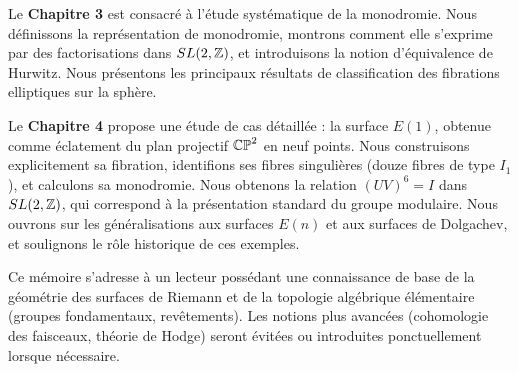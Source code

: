 Le \textbf{Chapitre 3} est consacré à l'étude systématique de la monodromie. Nous définissons la représentation de monodromie, montrons comment elle s'exprime par des factorisations dans $SL(2,\mathbb{Z})$, et introduisons la notion d'équivalence de Hurwitz. Nous présentons les principaux résultats de classification des fibrations elliptiques sur la sphère.

Le \textbf{Chapitre 4} propose une étude de cas détaillée : la surface $E(1)$, obtenue comme éclatement du plan projectif $\mathbb{CP}^2$ en neuf points. Nous construisons explicitement sa fibration, identifions ses fibres singulières (douze fibres de type $I_1$), et calculons sa monodromie. Nous obtenons la relation $(UV)^6 = I$ dans $SL(2,\mathbb{Z})$, qui correspond à la présentation standard du groupe modulaire. Nous ouvrons sur les généralisations aux surfaces $E(n)$ et aux surfaces de Dolgachev, et soulignons le rôle historique de ces exemples.

Ce mémoire s'adresse à un lecteur possédant une connaissance de base de la géométrie des surfaces de Riemann et de la topologie algébrique élémentaire (groupes fondamentaux, revêtements). Les notions plus avancées (cohomologie des faisceaux, théorie de Hodge) seront évitées ou introduites ponctuellement lorsque nécessaire.
